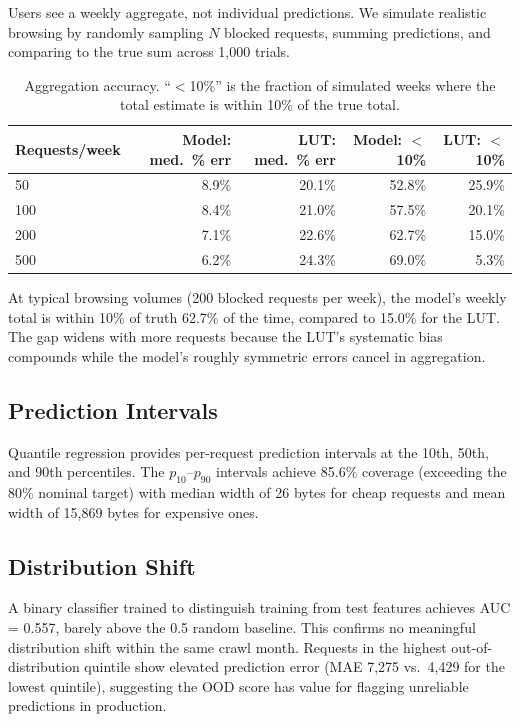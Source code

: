 \documentclass[11pt]{article}
\begin{document}
Users see a weekly aggregate, not individual predictions. We simulate realistic browsing by randomly sampling $N$ blocked requests, summing predictions, and comparing to the true sum across 1,000 trials.

\begin{table}[h]
\centering
\small
\begin{tabular}{lrrrr}
\toprule
Requests/week & Model: med.\ \% err & LUT: med.\ \% err & Model: $<$10\% & LUT: $<$10\% \\
\midrule
50 & 8.9\% & 20.1\% & 52.8\% & 25.9\% \\
100 & 8.4\% & 21.0\% & 57.5\% & 20.1\% \\
200 & 7.1\% & 22.6\% & 62.7\% & 15.0\% \\
500 & 6.2\% & 24.3\% & 69.0\% & 5.3\% \\
\bottomrule
\end{tabular}
\caption{Aggregation accuracy. ``$<$10\%'' is the fraction of simulated weeks where the total estimate is within 10\% of the true total.}
\label{tab:aggregation}
\end{table}

At typical browsing volumes (200 blocked requests per week), the model's weekly total is within 10\% of truth 62.7\% of the time, compared to 15.0\% for the LUT. The gap widens with more requests because the LUT's systematic bias compounds while the model's roughly symmetric errors cancel in aggregation.

\subsection{Prediction Intervals}

Quantile regression provides per-request prediction intervals at the 10th, 50th, and 90th percentiles. The $p_{10}$--$p_{90}$ intervals achieve 85.6\% coverage (exceeding the 80\% nominal target) with median width of 26 bytes for cheap requests and mean width of 15,869 bytes for expensive ones.

\subsection{Distribution Shift}

A binary classifier trained to distinguish training from test features achieves AUC = 0.557, barely above the 0.5 random baseline. This confirms no meaningful distribution shift within the same crawl month. Requests in the highest out-of-distribution quintile show elevated prediction error (MAE 7,275 vs.\ 4,429 for the lowest quintile), suggesting the OOD score has value for flagging unreliable predictions in production.
\end{document}
